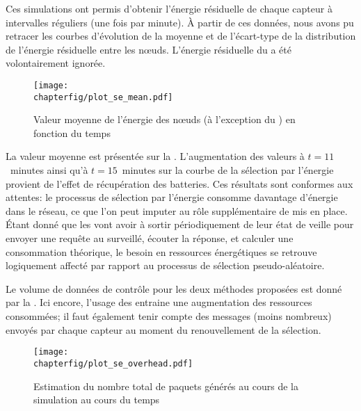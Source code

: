 Ces simulations ont permis d'obtenir l'énergie résiduelle de chaque capteur à intervalles réguliers (une fois par minute).
À partir de ces données, nous avons pu retracer les courbes d'évolution de la moyenne et de l'écart-type de la distribution de l'énergie résiduelle entre les nœuds.
L'énergie résiduelle du \ch a été volontairement ignorée.
\begin{figure}[!b]
    \centering
    \texttt{[image: \\chapterfig/plot\_se\_mean.pdf]}
    \caption[Valeur moyenne de l'énergie des nœuds en fonction du temps]{Valeur moyenne de l'énergie des nœuds (à l'exception du \ch) en fonction du temps}\label{se:fig:mean}
\end{figure}
La valeur moyenne est présentée sur la .
L'augmentation des valeurs à $t=11$~minutes ainsi qu'à $t=15$~minutes sur la courbe de la sélection par l'énergie provient de l'effet de récupération des batteries.
Ces résultats sont conformes aux attentes: le processus de sélection par l'énergie consomme davantage d'énergie dans le réseau, ce que l'on peut imputer au rôle supplémentaire de \vn mis en place.
Étant donné que les \vns vont avoir à sortir périodiquement de leur état de veille pour envoyer une requête au \cn surveillé, écouter la réponse, et calculer une consommation théorique, le besoin en ressources énergétiques se retrouve logiquement affecté par rapport au processus de sélection pseudo-aléatoire.

Le volume de données de contrôle pour les deux méthodes proposées est donné par la .
Ici encore, l'usage des \vns entraine une augmentation des ressources consommées; il faut également tenir compte des messages (moins nombreux) envoyés par chaque capteur au moment du renouvellement de la sélection.
\begin{figure}[!ht]
    \centering
    \texttt{[image: \\chapterfig/plot\_se\_overhead.pdf]}
    \caption{Estimation du nombre total de paquets générés au cours de la simulation au cours du temps}\label{se:fig:overhead}
\end{figure}

